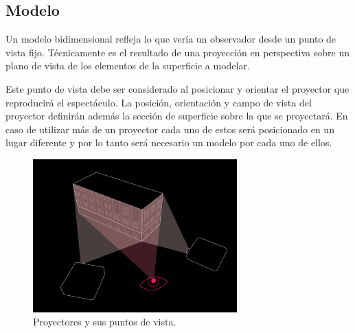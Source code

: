 \subsection{Modelo}
Un modelo bidimensional refleja lo que vería un observador desde un punto de vista fijo.
Técnicamente es el resultado de una proyección en perspectiva \cite{LibroCompGrafica} sobre un plano de vista de los elementos de la superficie a modelar.

Este punto de vista debe ser considerado al posicionar y orientar el proyector que reproducirá el espectáculo.
La posición, orientación y campo de vista del proyector definirán además la sección de superficie sobre la que se proyectará.
En caso de utilizar más de un proyector cada uno de estos será posicionado en un lugar diferente y por lo tanto será necesario un modelo por cada uno de ellos.

\begin{figure}[H]
  \centering
    \includegraphics[width=0.7\textwidth]{./Cap2_videomapping/diagrama-2proyectores}
  \caption{Proyectores y sus puntos de vista.}
  \label{fig:diagrama-2proyectores}
\end{figure}

